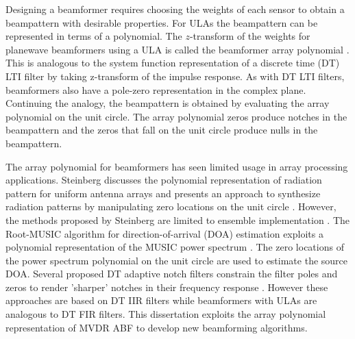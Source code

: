 Designing a beamformer requires choosing the weights of each sensor to
obtain a beampattern with desirable properties. For ULAs the
beampattern can be represented in terms of a polynomial. The
$z$-transform of the weights for planewave beamformers using a ULA is
called the beamformer array polynomial \cite{Schelkunoff1943array,
  vtree2002oap, Steinberg1976}. This is analogous to the system
function representation of a discrete time (DT) LTI filter by taking
z-transform of the impulse response. As with DT LTI filters,
beamformers also have a pole-zero representation in the complex
plane. Continuing the analogy, the beampattern is obtained by
evaluating the array polynomial on the unit circle. The array
polynomial zeros produce notches in the beampattern and the zeros that
fall on the unit circle produce nulls in the beampattern.

The array polynomial for beamformers has seen limited
usage in array processing applications. Steinberg discusses the
polynomial representation of radiation pattern for uniform antenna
arrays and presents an approach to synthesize radiation patterns by
manipulating zero locations on the unit circle
\cite{Steinberg1976}. However, the methods proposed by Steinberg are
limited to ensemble implementation \cite{Steinberg1976}. The
Root-MUSIC algorithm for direction-of-arrival (DOA) estimation
exploits a polynomial representation of the MUSIC power spectrum
\cite{hwang2008root}. The zero locations of the power spectrum
polynomial on the unit circle are used to estimate the source
DOA. Several proposed DT adaptive notch filters constrain the filter
poles and zeros to render 'sharper' notches in their frequency
response \cite{Nehorai1985, Friedlander1984notch, Shynk1986}. However
these approaches are based on DT IIR filters while beamformers with
ULAs are analogous to DT FIR filters. This dissertation exploits the
array polynomial representation of MVDR ABF to develop new beamforming
algorithms.


